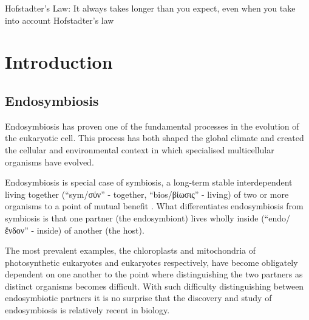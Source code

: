 \graphicspath{{chapters/1.Introduction/figures/}}

\begin{savequote}[75mm]
Hofstadter's Law: It always takes longer than you expect, even when you take into account Hofstadter's law
\end{savequote}

\chapter{Introduction}

\section{Endosymbiosis}

Endosymbiosis has proven one of the fundamental processes in the evolution of the
eukaryotic cell. This process has both shaped the global climate and
created the cellular and environmental context in which specialised multicellular
organisms have evolved.

Endosymbiosis is special case of symbiosis, a long-term stable interdependent 
living together (``sym/σύν'' - together, ``bios/βίωσις'' - living) of two or more 
organisms to a point of mutual benefit \citep{DeBary1879,Pound1893}. What differentiates
endosymbiosis from symbiosis is that one partner (the endosymbiont) lives wholly
inside (``endo/ἔνδον'' - inside) of another (the host). 

The most prevalent examples, the chloroplasts and mitochondria of photosynthetic eukaryotes and 
eukaryotes respectively, have become obligately dependent on one another to the point where distinguishing 
the two partners as distinct organisms becomes difficult.
With such difficulty distinguishing between endosymbiotic partners it is no 
surprise that the discovery and study of endosymbiosis is relatively recent in 
biology. 

